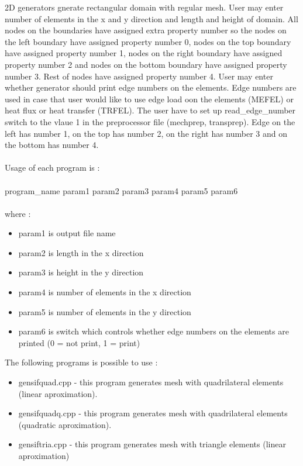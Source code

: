\documentclass[12pt]{book}
\begin{document}
2D generators gnerate rectangular domain with regular mesh. User may enter
number of elements in the x and y direction and length and height of domain.
All nodes on the boundaries have assigned extra property number so the nodes
on the left boundary have assigned property number 0, nodes on the top boundary
have assigned property number 1, nodes on the right boundary have assigned
property number 2 and nodes on the bottom boundary have assigned property
number 3. Rest of nodes have assigned property number 4.
User may enter whether generator should print edge numbers on the elements.
Edge numbers are used in case that user would like to use edge load oon the elements
(MEFEL) or heat flux or heat transfer (TRFEL). The user have to set up
read\_edge\_number switch to the vlaue 1 in the preprocessor file (mechprep, transprep).
Edge on the left has number 1, on the top has number 2, on the right has number 3 and
on the bottom has number 4.\\
\\
Usage of each program is :\\
\\
program\_name param1 param2 param3 param4 param5 param6\\
\\
where :
\begin{itemize}
\item param1 is output file name
\item param2 is length in the x direction
\item param3 is height in the y direction
\item param4 is number of elements in the x direction
\item param5 is number of elements in the y direction
\item param6 is switch which controls whether edge numbers on the elements are printed
          (0 = not print, 1 = print)
\end{itemize}
The following programs is possible to use :
\begin{itemize}
\item gensifquad.cpp  - this program generates mesh with quadrilateral elements (linear aproximation).
\item gensifquadq.cpp - this program generates mesh with quadrilateral elements (quadratic aproximation).
\item gensiftria.cpp  - this program generates mesh with triangle elements (linear aproximation)
\end{itemize}
\end{document}
